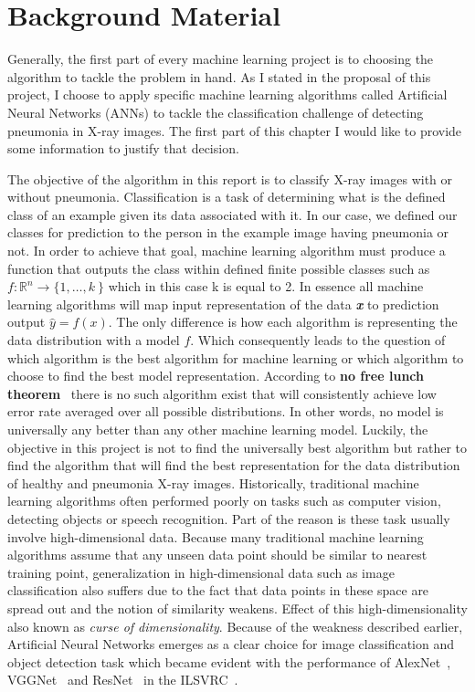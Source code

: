 \chapter{Background Material} \label{chap:background}
Generally, the first part of every machine learning project is to choosing the algorithm to tackle the problem in hand. As I stated in the proposal of this project, I choose to apply specific machine learning algorithms called Artificial Neural Networks (ANNs) to tackle the classification challenge of detecting pneumonia in X-ray images. The first part of this chapter I would like to provide some information to justify that decision. 

The objective of the algorithm in this report is to classify X-ray images with or without pneumonia. Classification is a task of determining what is the defined class of an example given its data associated with it. In our case, we defined our classes for prediction to the person in the example image having pneumonia or not. In order to achieve that goal, machine learning algorithm must produce a function that outputs the class within defined finite possible classes such as \(f:\mathbb{R}^n \rightarrow \{1, \ldots, k\ \}\) which in this case k is equal to 2. In essence all machine learning algorithms will map input representation of the data \textbf{\textit{x}} to prediction output $\hat{y}=f(x)$. The only difference is how each algorithm is representing the data distribution with a model $f$. Which consequently leads to the question of which algorithm is the best algorithm for machine learning or which algorithm to choose to find the best model representation. According to \textbf{no free lunch theorem}~\cite{nofreelunch} there is no such algorithm exist that will consistently achieve low error rate averaged over all possible distributions. In other words, no model is universally any better than any other machine learning model. Luckily, the objective in this project is not to find the universally best algorithm but rather to find the algorithm that will find the best representation for the data distribution of healthy and pneumonia X-ray images. 
Historically, traditional machine learning algorithms often performed poorly on tasks such as computer vision, detecting objects or speech recognition. Part of the reason is these task usually involve high-dimensional data. Because many traditional machine learning algorithms assume that any unseen data point should be similar to nearest training point, generalization in high-dimensional data such as image classification also suffers due to the fact that data points in these space are spread out and the notion of similarity weakens. Effect of this high-dimensionality also known as \emph{curse of dimensionality}.
Because of the weakness described earlier, Artificial Neural Networks emerges as a clear choice for image classification and object detection task which became evident with the performance of AlexNet~\cite{Alexnet}, VGGNet~\cite{vggnet} and ResNet~\cite{resnet} in the ILSVRC~\cite{imagenet}.  


